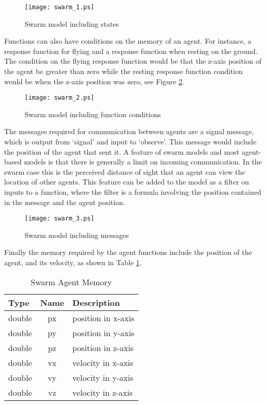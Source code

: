 \begin{figure}[ht]
\begin{center}
\texttt{[image: swarm\_1.ps]}
\caption{Swarm model including states}
\label{fig:swarm_1}
\end{center}
\end{figure}

Functions can also have conditions on the memory of an agent. For instance, a
response function for flying and a response function when resting on the ground.
The condition on the flying response function would be that the
z-axis position of the agent be greater than zero while the resting response
function condition would be when the z-axis position was zero, see Figure
\ref{fig:swarm_2}.

\begin{figure}[ht]
\begin{center}
\texttt{[image: swarm\_2.ps]}
\caption{Swarm model including function conditions}
\label{fig:swarm_2}
\end{center}
\end{figure}

The messages required for communication between agents are a signal message,
which is output from `signal' and input to `observe'. This message would include
the position of the agent that sent it. A feature of swarm models and most agent-based models is that
there is generally a limit on incoming communication. In the swarm case this is
the perceived distance of sight that an agent can view the location of other
agents. This feature can be added to the model as a filter on inputs to a
function, where the filter is a formula involving the position contained in the
message and the agent position.

\begin{figure}[ht]
\begin{center}
\texttt{[image: swarm\_3.ps]}
\caption{Swarm model including messages}
\label{fig:swarm_3}
\end{center}
\end{figure}

Finally the memory required by the agent functions include the position of the
agent, and its velocity, as shown in Table \ref{tab:swarm_memory}.

\begin{table}[ht]
\centering
\begin{tabular}{|l||c||l|}
\hline
Type&Name&Description\\
\hline \hline
double&px&position in x-axis\\
\hline
double&py&position in y-axis\\
\hline
double&pz&position in z-axis\\
\hline
double&vx&velocity in x-axis\\
\hline
double&vy&velocity in y-axis\\
\hline
double&vz&velocity in z-axis\\
\hline
\end{tabular}
\caption{Swarm Agent Memory}
\label{tab:swarm_memory}
\end{table}

